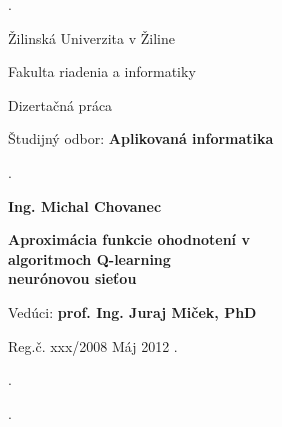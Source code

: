 \begin{titlepage}
\phantom.

\bigskip

\begin{center}
{\sc\LARGE Žilinská Univerzita v Žiline}
\medskip

{\sc\Large Fakulta riadenia a informatiky}

\vfill\vfill\vfill\vfill

{\sc\LARGE Dizertačná práca}

\medskip

{\large Študijný odbor: {\bf Aplikovaná informatika}}
\end{center}


\vfill\vfill\vfill\vfill


\phantom.\hfill
\begin{minipage}{10cm}
\begin{center}
{\large\bf Ing. Michal Chovanec}

\medskip

{\large\bf
  Aproximácia funkcie ohodnotení v \\
  algoritmoch Q-learning \\
  neurónovou sieťou
}

\medskip

Vedúci: {\bf prof. Ing. Juraj Miček, PhD}

\medskip

\hfill
Reg.č. xxx/2008
\hfill
Máj 2012
\hfill\phantom.
\end{center}
\end{minipage}
\hspace{1.7cm}\phantom.

\vspace{2.9cm}

\phantom.
\end{titlepage}



\begin{abstract}

\noindent
{\sc Priezvisko Meno:} {\em Názov diplomovej práce}
[Diplomová práca]

\noindent
Žilinská Univerzita v~Žiline,
Fakulta riadenia a informatiky,
Katedra matematických metód.

\noindent
Vedúci: doc. RNDr. Štefan Peško, CSc.

\noindent
Stupeň odbornej kvalifikácie:
Inžinier v~odbore .... Žilina.

\noindent
FRI ŽU v~Žiline, 2012 --- ?? s.

\bigskip

Obsahom práce je...


\end{abstract}


